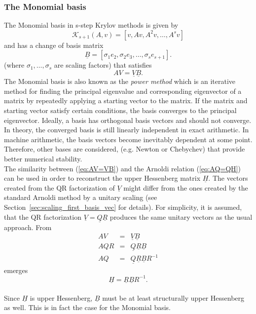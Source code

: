 \documentclass{scrartcl}
\numberwithin{equation}{section}
\begin{document}
\subsubsection{The Monomial basis}
The Monomial basis in s-step Krylov methods is given by 
\begin{equation*}
\mathcal{K}_{s + 1}(A, v) = [v, Av, A^2v, \ldots, A^sv]
\end{equation*}
and has a change of basis matrix
\begin{equation*}
\underline{B} = [\sigma_1 e_2, \sigma_2 e_3, \ldots, \sigma_s e_{s + 1}].
\end{equation*}
(where $\sigma_1, \ldots, \sigma_s$ are scaling factors) that satisfies
\begin{equation} \label{eq:AV=VB}
AV = \underline{V} \underline{B}.
\end{equation}
The Monomial basis is also known as the \textit{power method} which is an iterative method for finding the principal eigenvalue and corresponding eigenvector of a matrix by repeatedly applying a starting vector to the matrix. If the matrix and starting vector satisfy certain conditions, the basis converges to the principal eigenvector. Ideally, a basis has orthogonal basis vectors and should not converge. In theory, the converged basis is still linearly independent in exact arithmetic. In machine arithmetic, the basis vectors become inevitably dependent at some point. Therefore, other bases are considered, (e.g. Newton or Chebychev) that provide better numerical stability.\\

The similarity between (\ref{eq:AV=VB}) and the Arnoldi relation (\ref{eq:AQ=QH}) can be used in order to reconstruct the upper Hessenberg matrix $\underline{H}$. The vectors created from the QR factorization of $\underline{V}$ might differ from the ones created by the standard Arnoldi method by a unitary scaling (see Section~\ref{sec:scaling_first_basis_vec} for details). For simplicity, it is assumed, that the QR factorization $\underline{V} = \underline{Q} \underline{R}$ produces the same unitary vectors as the usual approach. From
\begin{eqnarray*}
	AV &=& \underline{V} \underline{B}\\
	AQR &=& \underline{Q} \underline{R} \underline{B}\\
	AQ &=& \underline{Q} \underline{R} \underline{B} R^{-1}
\end{eqnarray*}
emerges
\begin{equation} \label{eq:H=RBR}
	\underline{H} = \underline{R} \underline{B} R^{-1}.
\end{equation}
\\
Since $\underline{H}$ is upper Hessenberg, $\underline{B}$ must be at least structurally upper Hessenberg as well. This is in fact the case for the Monomial basis.
\end{document}
